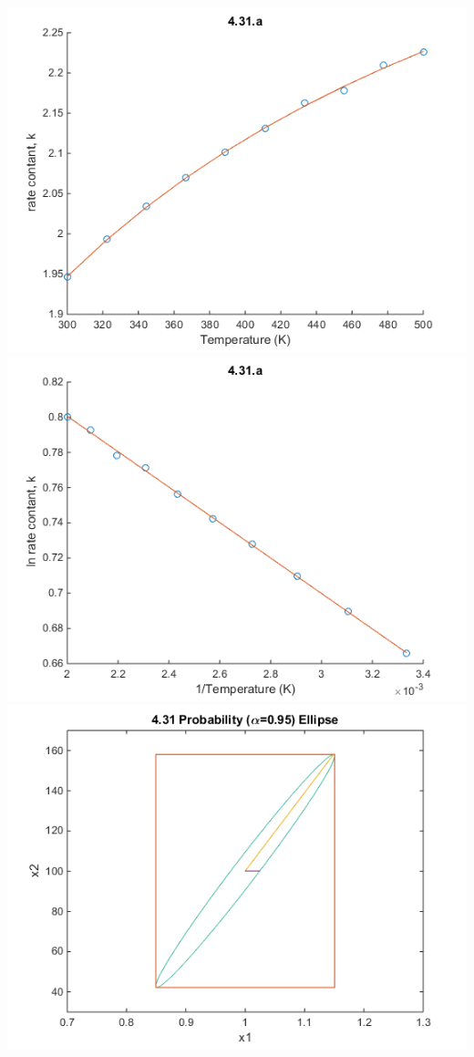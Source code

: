 \documentclass[10pt]{article}
\begin{document}
\includegraphics{CBE660_Assign10__2a.png} \\
\includegraphics{CBE660_Assign10__2b.png} \\
\includegraphics{CBE660_Assign10__2c.png}
\end{document}
